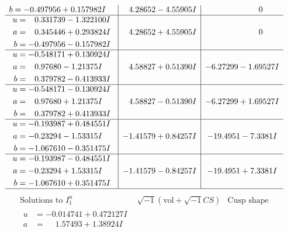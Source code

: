 \documentclass[1p]{elsarticle_modified}
\theoremstyle{definition}
\newcommand{\I}{\sqrt{-1}}
\begin{document}
$$\begin{array}{c|c|c}
\begin{aligned}
b &= -0.497956 + 0.157982 I\end{aligned}
 & \phantom{-}4.28652 - 4.55905 I & \phantom{-0.000000 } 0 \\ \hline\begin{aligned}
u &= \phantom{-}0.331739 - 1.322100 I \\
a &= \phantom{-}0.345446 + 0.293824 I \\
b &= -0.497956 - 0.157982 I\end{aligned}
 & \phantom{-}4.28652 + 4.55905 I & \phantom{-0.000000 } 0 \\ \hline\begin{aligned}
u &= -0.548171 + 0.130924 I \\
a &= \phantom{-}0.97680 - 1.21375 I \\
b &= \phantom{-}0.379782 - 0.413933 I\end{aligned}
 & \phantom{-}4.58827 + 0.51390 I & -6.27299 - 1.69527 I \\ \hline\begin{aligned}
u &= -0.548171 - 0.130924 I \\
a &= \phantom{-}0.97680 + 1.21375 I \\
b &= \phantom{-}0.379782 + 0.413933 I\end{aligned}
 & \phantom{-}4.58827 - 0.51390 I & -6.27299 + 1.69527 I \\ \hline\begin{aligned}
u &= -0.193987 + 0.484551 I \\
a &= -0.23294 - 1.53315 I \\
b &= -1.067610 - 0.351475 I\end{aligned}
 & -1.41579 + 0.84257 I & -19.4951 - 7.3381 I \\ \hline\begin{aligned}
u &= -0.193987 - 0.484551 I \\
a &= -0.23294 + 1.53315 I \\
b &= -1.067610 + 0.351475 I\end{aligned}
 & -1.41579 - 0.84257 I & -19.4951 + 7.3381 I\\
 \hline 
 \end{array}$$\newpage$$\begin{array}{c|c|c}  
\text{Solutions to }I^u_{1}& \I (\text{vol} + \sqrt{-1}CS) & \text{Cusp shape}\\
 \hline 
\begin{aligned}
u &= -0.014741 + 0.472127 I \\
a &= \phantom{-}1.57493 + 1.38924 I \\

\end{aligned}
\end{array}$$
\end{document}
